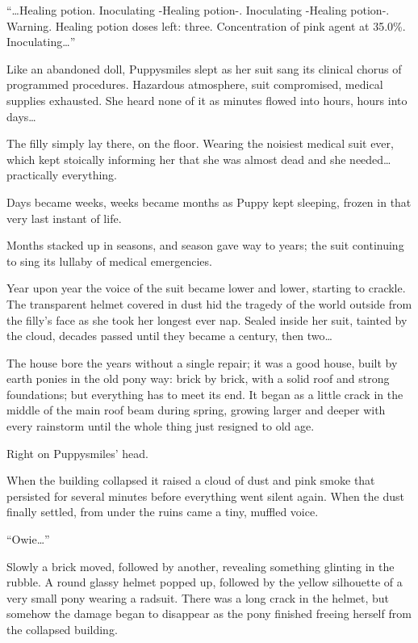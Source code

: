 ``{\mt \dots Healing potion. Inoculating -Healing potion-. Inoculating -Healing potion-. Warning. Healing potion doses left: three. Concentration of pink agent at 35.0\%. Inoculating\dots}''

Like an abandoned doll, Puppysmiles slept as her suit sang its clinical chorus of programmed procedures. Hazardous atmosphere, suit compromised, medical supplies exhausted. She heard none of it as minutes flowed into hours, hours into days\dots

The filly simply lay there, on the floor. Wearing the noisiest medical suit ever, which kept stoically informing her that she was almost dead and she needed\dots practically everything.

Days became weeks, weeks became months as Puppy kept sleeping, frozen in that very last instant of life.

Months stacked up in seasons, and season gave way to years; the suit continuing to sing its lullaby of medical emergencies.

Year upon year the voice of the suit became lower and lower, starting to crackle. The transparent helmet covered in dust hid the tragedy of the world outside from the filly's face as she took her longest ever nap. Sealed inside her suit, tainted by the cloud, decades passed until they became a century, then two\dots

The house bore the years without a single repair; it was a good house, built by earth ponies in the old pony way: brick by brick, with a solid roof and strong foundations; but everything has to meet its end. It began as a little crack in the middle of the main roof beam during spring, growing larger and deeper with every rainstorm until the whole thing just resigned to old age.

Right on Puppysmiles' head.

\horizonline


When the building collapsed it raised a cloud of dust and pink smoke that persisted for several minutes before everything went silent again. When the dust finally settled, from under the ruins came a tiny, muffled voice.

``Owie\dots''

Slowly a brick moved, followed by another, revealing something glinting in the rubble. A round glassy helmet popped up, followed by the yellow silhouette of a very small pony wearing a radsuit. There was a long crack in the helmet, but somehow the damage began to disappear as the pony finished freeing herself from the collapsed building.

